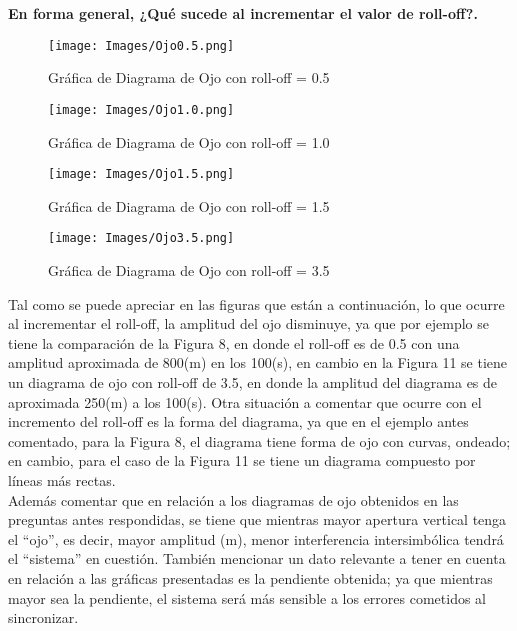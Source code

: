 \documentclass[lettersize,journal]{IEEEtran}
\begin{document}
\textbf{En forma general, ¿Qué sucede al incrementar el valor de roll-off?.}\\
\begin{figure}[h!]
    \centering
    \texttt{[image: Images/Ojo0.5.png]}
    \caption{Gráfica de Diagrama de Ojo con roll-off = 0.5}
    \label{fig:my_label}
\end{figure}

\begin{figure}[h!]
    \centering
    \texttt{[image: Images/Ojo1.0.png]}
    \caption{Gráfica de Diagrama de Ojo con roll-off = 1.0}
    \label{fig:my_label}
\end{figure}

\begin{figure}[h!]
    \centering
    \texttt{[image: Images/Ojo1.5.png]}
    \caption{Gráfica de Diagrama de Ojo con roll-off = 1.5}
    \label{fig:my_label}
\end{figure}

\begin{figure}[h!]
    \centering
    \texttt{[image: Images/Ojo3.5.png]}
    \caption{Gráfica de Diagrama de Ojo con roll-off = 3.5}
    \label{fig:my_label}
\end{figure}



Tal como se puede apreciar en las figuras que están a continuación, lo que ocurre al incrementar el roll-off, la amplitud del ojo disminuye, ya que por ejemplo se tiene la comparación de la Figura 8, en donde el roll-off es de 0.5 con una amplitud aproximada de 800(m) en los 100(s), en cambio en la Figura 11 se tiene un diagrama de ojo con roll-off de 3.5, en donde la amplitud del diagrama es de aproximada 250(m) a los 100(s). Otra situación a comentar que ocurre con el incremento del roll-off es la forma del diagrama, ya que en el ejemplo antes comentado, para la Figura 8, el diagrama tiene forma de ojo con curvas, ondeado; en cambio, para el caso de la Figura 11 se tiene un diagrama compuesto por líneas más rectas.\\

Además comentar que en relación a los diagramas de ojo obtenidos en las preguntas antes respondidas, se tiene que mientras mayor apertura vertical tenga el ``ojo'', es decir, mayor amplitud (m), menor interferencia intersimbólica tendrá el ``sistema'' en cuestión. También mencionar un dato relevante a tener en cuenta en relación a las gráficas presentadas es la pendiente obtenida; ya que mientras mayor sea la pendiente, el sistema será más sensible a los errores cometidos al sincronizar. \cite{ref2}
\end{document}
